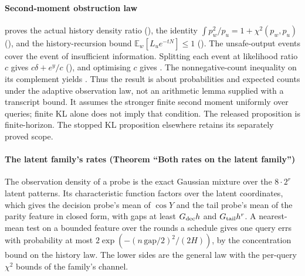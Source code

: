 \paragraph{Second-moment obstruction law}
 proves the actual history density ratio (),
the identity $\int p_w^2/p_u=1+\chi^2(p_w,p_u)$ (), and the
history-recursion bound $\mathbb E_w[L_u e^{-tN}]\le1$ ().
The unsafe-output events cover the event of insufficient information. Splitting each event
at likelihood ratio $c$ gives $c\delta+e^y/c$ (), and optimising $c$
gives . The nonnegative-count inequality on its complement yields
. Thus the result is about probabilities and expected counts under
the adaptive observation law, not an arithmetic lemma supplied with a transcript bound.
It assumes the stronger finite second moment uniformly over queries; finite KL alone does
not imply that condition. The released proposition is finite-horizon. The stopped KL
proposition elsewhere retains its separately proved scope.

\paragraph{The latent family's rates (Theorem ``Both rates on the latent family'')} The observation
density of a probe is the exact Gaussian mixture over the $8\cdot2^{r}$ latent patterns. Its
characteristic function factors over the latent coordinates, which gives the decision probe's mean
of $\cos Y$ and the tail probe's mean of the parity feature in closed form, with gaps at least
$G_{\rm dec}h$ and $G_{\rm tail}h^{r}$. A nearest-mean test on a bounded feature over the rounds a
schedule gives one query errs with probability at most $2\exp(-(n\,\mathrm{gap}/2)^{2}/(2H))$, by the
concentration bound on the history law. The lower sides are the general law with the per-query
$\chi^{2}$ bounds of the family's channel.


